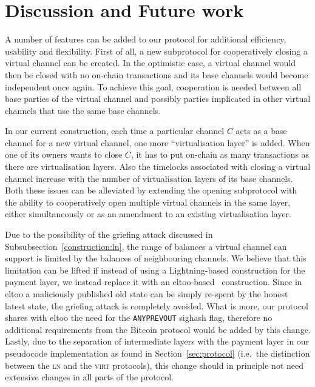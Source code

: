 \section{Discussion and Future work}
  A number of features can be added to our protocol for additional efficiency,
  usability and flexibility. First of all, a new subprotocol for cooperatively
  closing a virtual channel can be created. In the optimistic case, a virtual
  channel would then be closed with no on-chain transactions and its base
  channels would become independent once again. To achieve this goal,
  cooperation is needed between all base parties of the virtual channel and
  possibly parties implicated in other virtual channels that use the same base
  channels.

  In our current construction, each time a particular channel $C$ acts as a base
  channel for a new virtual channel, one more ``virtualisation layer'' is added. When
  one of its owners wants to close $C$, it has to put on-chain as many
  transactions as there are virtualisation layers. Also the timelocks associated
  with closing a virtual channel increase with the number of virtualisation
  layers of its base channels. Both these issues can be alleviated by extending
  the opening subprotocol with the ability to cooperatively open multiple
  virtual channels in the same layer, either simultaneously or as an amendment
  to an existing virtualisation layer.

  Due to the possibility of the griefing attack discussed in
  Subsubsection~\ref{construction:ln}, the range of balances a virtual channel can
  support is limited by the balances of neighbouring channels. We believe that
  this limitation can be lifted if instead of using a Lightning-based
  construction for the payment layer, we instead replace it with an
  eltoo-based~\cite{eltoo} construction. Since in eltoo a maliciously published
  old state can be simply re-spent by the honest latest state, the griefing
  attack is completely avoided. What is more, our protocol shares with eltoo the
  need for the \texttt{ANYPREVOUT} sighash flag, therefore no additional
  requirements from the Bitcoin protocol would be added by this change. Lastly,
  due to the separation of intermediate layers with the payment layer in our
  pseudocode implementation as found in Section~\ref{sec:protocol} (i.e.\ the distinction
  between the \textsc{ln} and the \textsc{virt} protocols), this change should
  in principle not need extensive changes in all parts of the protocol.

